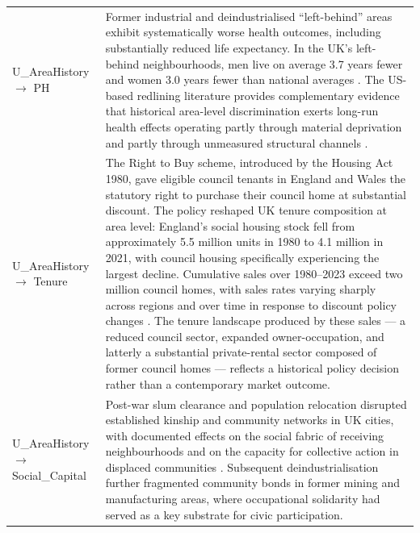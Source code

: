\begin{longtable}{@{}p{3.8cm}p{11.2cm}@{}}
\addlinespace
U\_AreaHistory $\to$ PH & Former industrial and deindustrialised ``left-behind'' areas exhibit systematically worse health outcomes, including substantially reduced life expectancy. In the UK's left-behind neighbourhoods, men live on average 3.7 years fewer and women 3.0 years fewer than national averages \citep{case_health_2024}. The US-based redlining literature provides complementary evidence that historical area-level discrimination exerts long-run health effects operating partly through material deprivation and partly through unmeasured structural channels \citep{kraus_historic_2023}. \\
\addlinespace
U\_AreaHistory $\to$ Tenure & The Right to Buy scheme, introduced by the Housing Act 1980, gave eligible council tenants in England and Wales the statutory right to purchase their council home at substantial discount. The policy reshaped UK tenure composition at area level: England's social housing stock fell from approximately 5.5 million units in 1980 to 4.1 million in 2021, with council housing specifically experiencing the largest decline. Cumulative sales over 1980--2023 exceed two million council homes, with sales rates varying sharply across regions and over time in response to discount policy changes \citep{jones_right_2006, disney_right_2017, ministry_of_housing_communities_and_local_government_social_2024}. The tenure landscape produced by these sales — a reduced council sector, expanded owner-occupation, and latterly a substantial private-rental sector composed of former council homes — reflects a historical policy decision rather than a contemporary market outcome. \\
\addlinespace
U\_AreaHistory $\to$ Social\_Capital & Post-war slum clearance and population relocation disrupted established kinship and community networks in UK cities, with documented effects on the social fabric of receiving neighbourhoods and on the capacity for collective action in displaced communities \citep{young_family_1957, crawford_slum_2019}. Subsequent deindustrialisation further fragmented community bonds in former mining and manufacturing areas, where occupational solidarity had served as a key substrate for civic participation. \\
\end{longtable}



